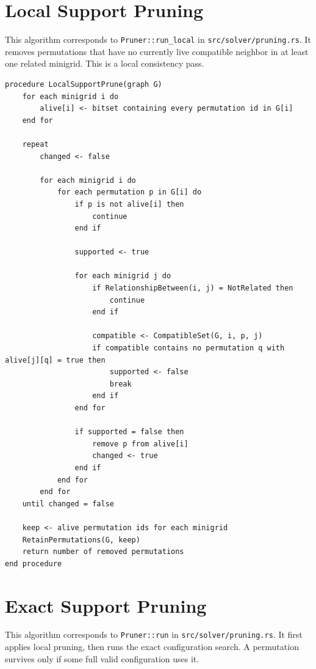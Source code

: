 \documentclass[11pt,a4paper]{article}
\begin{document}
\section{Local Support Pruning}

This algorithm corresponds to \texttt{Pruner::run\_local} in \texttt{src/solver/pruning.rs}. It removes permutations that have no currently live compatible neighbor in at least one related minigrid. This is a local consistency pass.

\begin{lstlisting}[caption={Iterative local support pruning}]
procedure LocalSupportPrune(graph G)
    for each minigrid i do
        alive[i] <- bitset containing every permutation id in G[i]
    end for

    repeat
        changed <- false

        for each minigrid i do
            for each permutation p in G[i] do
                if p is not alive[i] then
                    continue
                end if

                supported <- true

                for each minigrid j do
                    if RelationshipBetween(i, j) = NotRelated then
                        continue
                    end if

                    compatible <- CompatibleSet(G, i, p, j)
                    if compatible contains no permutation q with alive[j][q] = true then
                        supported <- false
                        break
                    end if
                end for

                if supported = false then
                    remove p from alive[i]
                    changed <- true
                end if
            end for
        end for
    until changed = false

    keep <- alive permutation ids for each minigrid
    RetainPermutations(G, keep)
    return number of removed permutations
end procedure
\end{lstlisting}

\section{Exact Support Pruning}

This algorithm corresponds to \texttt{Pruner::run} in \texttt{src/solver/pruning.rs}. It first applies local pruning, then runs the exact configuration search. A permutation survives only if some full valid configuration uses it.
\end{document}
